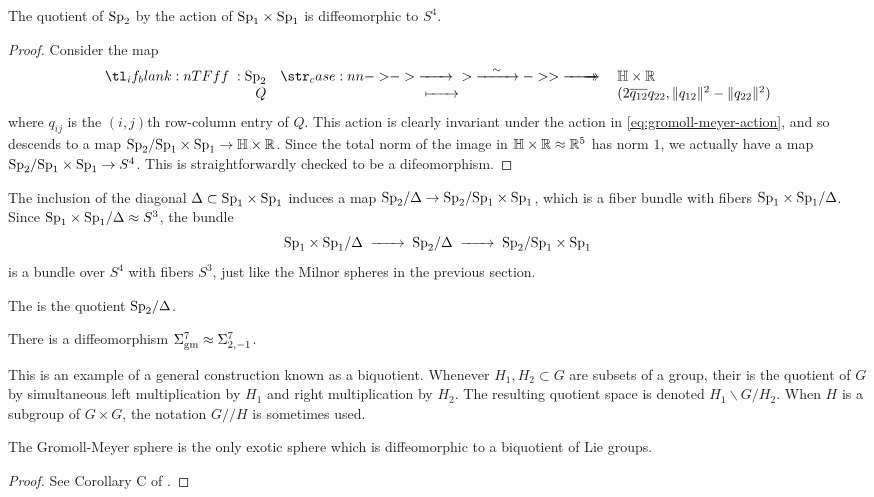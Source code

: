 \begin{proposition}
	The quotient of $\mathrm{Sp}_2$ by the action of $\mathrm{Sp}_1\times \mathrm{Sp}_1$ is diffeomorphic to $S^4$.
\end{proposition}
\begin{proof}
	Consider the map
	\[
		\lkxfunc{f}{\Sp_2}{\HH\times \R}{Q}{(2\overline{q_{12}}q_{22}, \|q_{12}\|^2 - \|q_{22}\|^2)}
	\]
	where $q_{ij}$ is the $(i,j)$th row-column entry of $Q$. This action is clearly invariant under the action in \cref{eq:gromoll-meyer-action}, and so descends to a map $\mathrm{Sp}_2/\mathrm{Sp}_1\times \mathrm{Sp}_1 \to \mathbb{H}\times \mathbb{R}$. Since the total norm of the image in $\mathbb{H}\times \mathbb{R}\approx \mathbb{R}^5$ has norm $1$, we actually have a map $\mathrm{Sp}_2/\mathrm{Sp}_1\times \mathrm{Sp}_1\to S^4$. This is straightforwardly checked to be a difeomorphism.
\end{proof}

The inclusion of the diagonal $\Delta \subset \mathrm{Sp}_1\times \mathrm{Sp}_1$ induces a map $\mathrm{Sp}_2/\Delta \to \mathrm{Sp}_2/\mathrm{Sp}_1\times \mathrm{Sp}_1$, which is a fiber bundle with fibers $\mathrm{Sp}_1\times \mathrm{Sp}_1/ \Delta$. Since $\mathrm{Sp}_1\times \mathrm{Sp}_1/\Delta\approx S^3$, the bundle
\[
	\Sp_1\times\Sp_1/\Delta \lkxto \Sp_2/\Delta \lkxto \Sp_2/\Sp_1\times \Sp_1
\]
is a bundle over $S^4$ with fibers $S^3$, just like the Milnor spheres in the previous section.

\begin{definition}
	The  is the quotient $\mathrm{Sp}_2/\Delta$.
\end{definition}

\begin{proposition}
	There is a diffeomorphism $\Sigma^7_{\mathrm{gm}} \approx \Sigma^7_{2,-1}$.
\end{proposition}

This is an example of a general construction known as a biquotient. Whenever $H_1,H_2\subset G$ are subsets of a group, their  is the quotient of $G$ by simultaneous left multiplication by $H_1$ and right multiplication by $H_2$. The resulting quotient space is denoted $H_1\backslash G/H_2$. When $H$ is a subgroup of $G\times G$, the notation $G/\!/H$ is sometimes used.

\begin{theorem}
	The Gromoll-Meyer sphere is the only exotic sphere which is diffeomorphic to a biquotient of Lie groups.
\end{theorem}
\begin{proof}
	See Corollary C of \cite{KZ2004biquotients}.
\end{proof}


